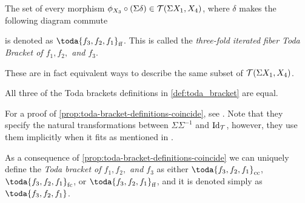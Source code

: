 \begin{definition}
\begin{enumerate}
{            The set of every morphism \( \phi_{X_3} \circ (\Sigma \delta) \in {\mathcal{T}}(\Sigma X_1, X_4) \), where \( \delta \) makes the following diagram commute
            \begin{center}
            \end{center}
            is denoted as \( \toda{f_3, f_2, f_1}_{\ff} \). This is called the \emph{three-fold iterated fiber Toda Bracket of \( f_1, f_2, \) and \( f_3 \)}.
        }
    \end{enumerate}
\end{definition}

These are in fact equivalent ways to describe the same subset of \( {\mathcal{T}}(\Sigma X_1, X_4) \).

\begin{proposition}
    \label{prop:toda-bracket-definitions-coincide}
    All three of the Toda brackets definitions in \autoref{def:toda_bracket} are equal.
\end{proposition}

For a proof of \autoref{prop:toda-bracket-definitions-coincide}, see \cite[Proposition 3.3]{Christensen-Frankland_2017}. Note that they specify the natural transformations between \( \Sigma \Sigma^{-1} \) and \( \operatorname{Id}_{{\mathcal{T}}} \), however, they use them implicitly when it fits as mentioned in \cite[p.\ 2690]{Christensen-Frankland_2017}.

As a consequence of \autoref{prop:toda-bracket-definitions-coincide} we can uniquely define the \emph{Toda bracket of \( f_1, f_2, \) and \( f_3 \)} as either \( \toda{f_3, f_2, f_1}_{\cc} \), \( \toda{f_3, f_2, f_1}_{\fc} \), or \( \toda{f_3, f_2, f_1}_{\ff} \), and it is denoted simply as \emph{\( \toda{f_3, f_2, f_1} \)}.

